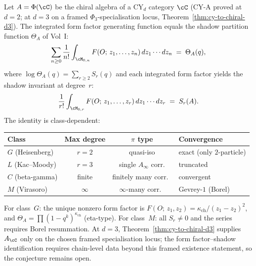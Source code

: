 \begin{conjecture}
\label{conj:form-factor-shadow-pf}
\ClaimStatusConjectured
{}%
Let $A = \Phi(\cC)$ be the chiral algebra of a CY$_d$ category $\cC$
(CY-A proved at $d = 2$; at $d = 3$ on a framed $\Phi_3$-specialisation locus, Theorem~\ref{thm:cy-to-chiral-d3}). The
integrated form factor generating function equals the shadow partition
function $\Theta_A$ of Vol~I:
\[
 \sum_{n \geq 0} \frac{1}{n!}
 \int_{\cM_{0,n}} F(O;\, z_1, \ldots, z_n)\, dz_1 \cdots dz_n
 \;=\; \Theta_A(q),
\]
where $\log \Theta_A(q) = \sum_{r \geq 2} S_r(q)$ and each integrated form
factor yields the shadow invariant at degree~$r$:
\begin{equation}\label{eq:ff-shadow-invariant}
 \frac{1}{r!} \int_{\cM_{0,r}} F(O;\, z_1, \ldots, z_r)\, dz_1 \cdots dz_r
 \;=\; S_r(A).
\end{equation}
The identity is class-dependent:
\begin{center}
\small
\renewcommand{\arraystretch}{1.15}
\begin{tabular}{lccl}
\toprule
\textbf{Class} & \textbf{Max degree} & $\pi$\textbf{ type} & \textbf{Convergence} \\
\midrule
$G$ (Heisenberg) & $r = 2$ & quasi-iso & exact (only $2$-particle) \\
$L$ (Kac--Moody) & $r = 3$ & single $A_\infty$ corr. & truncated \\
$C$ (beta-gamma) & finite & finitely many corr.\ & convergent \\
$M$ (Virasoro) & $\infty$ & $\infty$-many corr.\ & Gevrey-$1$ (Borel) \\
\bottomrule
\end{tabular}
\end{center}
For class~$G$: the unique nonzero form factor is
$F(O;\, z_1, z_2) = \kappa_{\mathrm{ch}} / (z_1 - z_2)^2$, and
$\Theta_A = \prod(1 - q^k)^{\kappa_{\mathrm{ch}}}$ (eta-type).
For class~$M$: all $S_r \neq 0$ and the series requires Borel resummation.
At $d = 3$, Theorem~\ref{thm:cy-to-chiral-d3} supplies $A_\cC$ only on the chosen framed specialisation locus; the form factor--shadow identification requires chain-level data beyond this framed existence statement, so the conjecture remains open.
\end{conjecture}

